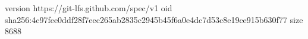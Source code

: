 version https://git-lfs.github.com/spec/v1
oid sha256:4c97fee0ddf28f7eec265ab2835c2945b45f6a0e4dc7d53c8e19ce915b630f77
size 8688
